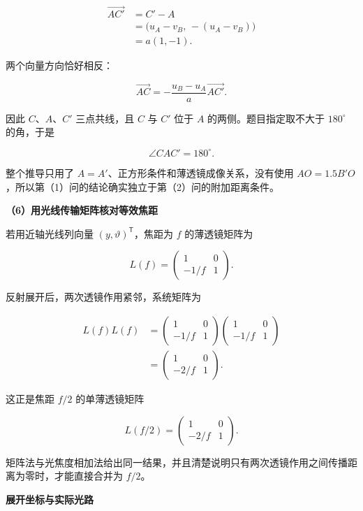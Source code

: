 \documentclass[12pt,a4paper,UTF8]{ctexart}
\begin{document}
\[
\begin{aligned}
\overrightarrow{AC'}
&=C'-A\\
&=\bigl(u_A-v_B,\,-(u_A-v_B)\bigr)\\
&=a(1,-1).
\end{aligned}
\tag{33}
\]

两个向量方向恰好相反：

\[
\overrightarrow{AC}
=-\frac{u_B-u_A}{a}\overrightarrow{AC'}.
\tag{34}
\]

因此 \(C\)、\(A\)、\(C'\) 三点共线，且 \(C\) 与 \(C'\) 位于 \(A\)
的两侧。题目指定取不大于 \(180^\circ\) 的角，于是

\[
\boxed{\angle CAC'=180^\circ}.
\tag{35}
\]

整个推导只用了 \(A=A'\)、正方形条件和薄透镜成像关系，没有使用
\(AO=1.5B'O\)，所以第（1）问的结论确实独立于第（2）问的附加距离条件。

\textbf{（6）用光线传输矩阵核对等效焦距}

若用近轴光线列向量 \((y,\vartheta)^{\mathsf T}\)，焦距为 \(f\)
的薄透镜矩阵为

\[
L(f)=
\begin{pmatrix}
1&0\\
-1/f&1
\end{pmatrix}.
\tag{36}
\]

反射展开后，两次透镜作用紧邻，系统矩阵为

\[
\begin{aligned}
L(f)L(f)
&=
\begin{pmatrix}
1&0\\
-1/f&1
\end{pmatrix}
\begin{pmatrix}
1&0\\
-1/f&1
\end{pmatrix}\\
&=
\begin{pmatrix}
1&0\\
-2/f&1
\end{pmatrix}.
\end{aligned}
\tag{37}
\]

这正是焦距 \(f/2\) 的单薄透镜矩阵

\[
L(f/2)=
\begin{pmatrix}
1&0\\
-2/f&1
\end{pmatrix}.
\]

矩阵法与光焦度相加法给出同一结果，并且清楚说明只有两次透镜作用之间传播距离为零时，才能直接合并为
\(f/2\)。

\textbf{展开坐标与实际光路}
\end{document}
